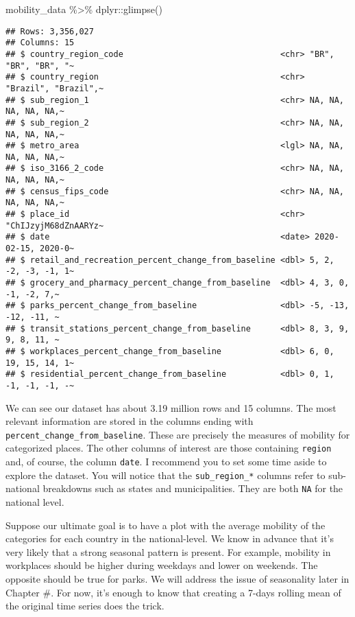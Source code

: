 \documentclass[
]{book}
\newenvironment{Shaded}{\begin{snugshade}}{\end{snugshade}}
\newcommand{\FunctionTok}[1]{\textcolor[rgb]{0.00,0.00,0.00}{#1}}
\newcommand{\NormalTok}[1]{#1}
\newcommand{\SpecialCharTok}[1]{\textcolor[rgb]{0.00,0.00,0.00}{#1}}
\begin{document}
\begin{Shaded}
\begin{Highlighting}[]
\NormalTok{mobility\_data }\SpecialCharTok{\%\textgreater{}\%}
\NormalTok{  dplyr}\SpecialCharTok{::}\FunctionTok{glimpse}\NormalTok{()}
\end{Highlighting}
\end{Shaded}

\begin{verbatim}
## Rows: 3,356,027
## Columns: 15
## $ country_region_code                                <chr> "BR", "BR", "BR", "~
## $ country_region                                     <chr> "Brazil", "Brazil",~
## $ sub_region_1                                       <chr> NA, NA, NA, NA, NA,~
## $ sub_region_2                                       <chr> NA, NA, NA, NA, NA,~
## $ metro_area                                         <lgl> NA, NA, NA, NA, NA,~
## $ iso_3166_2_code                                    <chr> NA, NA, NA, NA, NA,~
## $ census_fips_code                                   <chr> NA, NA, NA, NA, NA,~
## $ place_id                                           <chr> "ChIJzyjM68dZnAARYz~
## $ date                                               <date> 2020-02-15, 2020-0~
## $ retail_and_recreation_percent_change_from_baseline <dbl> 5, 2, -2, -3, -1, 1~
## $ grocery_and_pharmacy_percent_change_from_baseline  <dbl> 4, 3, 0, -1, -2, 7,~
## $ parks_percent_change_from_baseline                 <dbl> -5, -13, -12, -11, ~
## $ transit_stations_percent_change_from_baseline      <dbl> 8, 3, 9, 9, 8, 11, ~
## $ workplaces_percent_change_from_baseline            <dbl> 6, 0, 19, 15, 14, 1~
## $ residential_percent_change_from_baseline           <dbl> 0, 1, -1, -1, -1, -~
\end{verbatim}

We can see our dataset has about 3.19 million rows and 15 columns. The most relevant information are stored in the columns ending with \texttt{percent\_change\_from\_baseline}. These are precisely the measures of mobility for categorized places. The other columns of interest are those containing \texttt{region} and, of course, the column \texttt{date}. I recommend you to set some time aside to explore the dataset. You will notice that the \texttt{sub\_region\_*} columns refer to sub-national breakdowns such as states and municipalities. They are both \texttt{NA} for the national level.

Suppose our ultimate goal is to have a plot with the average mobility of the categories for each country in the national-level. We know in advance that it's very likely that a strong seasonal pattern is present. For example, mobility in workplaces should be higher during weekdays and lower on weekends. The opposite should be true for parks. We will address the issue of seasonality later in Chapter \#. For now, it's enough to know that creating a 7-days rolling mean of the original time series does the trick.
\end{document}
